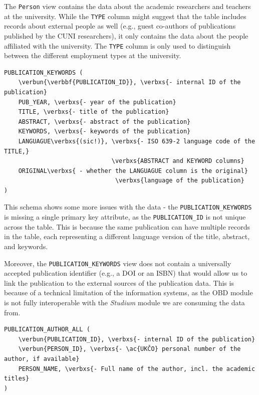 The \texttt{Person} view contains the data about the academic researchers and teachers at the university.
While the \texttt{TYPE} column might suggest that the table includes records about external people as well (e.g., guest co-authors of publications published by the \ac{CUNI} researchers),
it only contains the data about the people affiliated with the university. The \texttt{TYPE} column is only used to distinguish between the different employment types at the university.

\begin{Verbatim}[commandchars=\\\{\}]
PUBLICATION_KEYWORDS (
    \verbun{\verbbf{PUBLICATION_ID}}, \verbxs{- internal ID of the publication}
    PUB_YEAR, \verbxs{- year of the publication}
    TITLE, \verbxs{- title of the publication}
    ABSTRACT, \verbxs{- abstract of the publication}
    KEYWORDS, \verbxs{- keywords of the publication}
    LANGUAGUE\verbxs{(sic!)}, \verbxs{- ISO 639-2 language code of the TITLE,}
                              \verbxs{ABSTRACT and KEYWORD columns}
    ORIGINAL\verbxs{ - whether the LANGUAGUE column is the original}
                               \verbxs{language of the publication}
)
\end{Verbatim}

This schema shows some more issues with the data - the \texttt{PUBLICATION\_KEYWORDS} is missing a single primary key attribute,
as the \texttt{PUBLICATION\_ID} is not unique across the table. This is because the same publication can have multiple records in the table,
each representing a different language version of the title, abstract, and keywords.

Moreover, the \texttt{PUBLICATION\_KEYWORDS} view does not contain a universally accepted publication identifier (e.g., a \ac{DOI} or an \ac{ISBN}) 
that would allow us to link the publication to the external sources of the publication data.
This is because of a technical limitation of the information systems, as the \ac{OBD} module is not fully interoperable with the \textit{Studium} module we are 
consuming the data from.

\label{sec:pub-author-all}
\begin{Verbatim}[commandchars=\\\{\}]
PUBLICATION_AUTHOR_ALL (
    \verbun{PUBLICATION_ID}, \verbxs{- internal ID of the publication}
    \verbun{PERSON_ID}, \verbxs{- \ac{UKČO} personal number of the author, if available}
    PERSON_NAME, \verbxs{- Full name of the author, incl. the academic titles}
)
\end{Verbatim}

